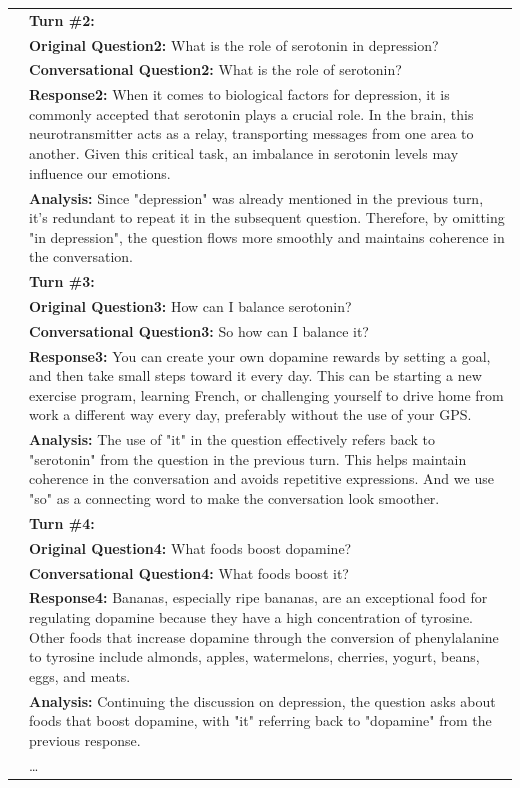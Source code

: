 \documentclass[11pt]{article}
\begin{document}
{\begin{longtable}{c p{12cm}}
& \textbf{Turn \#2:} \\
& \textbf{Original Question2:} What is the role of serotonin in depression? \\
& \textbf{Conversational Question2:} What is the role of serotonin? \\


& \textbf{Response2:} When it comes to biological factors for depression, it is commonly accepted that serotonin plays a crucial role. In the brain, this neurotransmitter acts as a relay, transporting messages from one area to another. Given this critical task, an imbalance in serotonin levels may influence our emotions.  \\
& \textbf{Analysis:} Since "depression" was already mentioned in the previous turn, it's redundant to repeat it in the subsequent question. Therefore, by omitting "in depression", the question flows more smoothly and maintains coherence in the conversation. \\

& \textbf{Turn \#3:} \\
& \textbf{Original Question3:} How can I balance serotonin? \\
& \textbf{Conversational Question3:} So how can I balance it? \\


& \textbf{Response3:} You can create your own dopamine rewards by setting a goal, and then take small steps toward it every day. This can be starting a new exercise program, learning French, or challenging yourself to drive home from work a different way every day, preferably without the use of your GPS. \\
& \textbf{Analysis:} The use of "it" in the question effectively refers back to "serotonin" from the question in the previous turn. This helps maintain coherence in the conversation and avoids repetitive expressions. And we use "so" as a connecting word to make the conversation look smoother.\\

& \textbf{Turn \#4:} \\
& \textbf{Original Question4:} What foods boost dopamine? \\
& \textbf{Conversational Question4:} What foods boost it? \\


& \textbf{Response4:} Bananas, especially ripe bananas, are an exceptional food for regulating dopamine because they have a high concentration of tyrosine. Other foods that increase dopamine through the conversion of phenylalanine to tyrosine include almonds, apples, watermelons, cherries, yogurt, beans, eggs, and meats.  \\
& \textbf{Analysis:} Continuing the discussion on depression, the question asks about foods that boost dopamine, with "it" referring back to "dopamine" from the previous response.  \\
& \dots \\


\end{longtable}}
\end{document}
